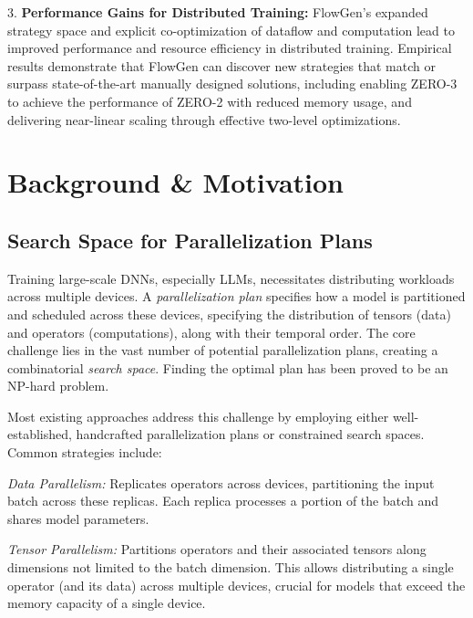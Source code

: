3. \textbf{Performance Gains for Distributed Training:} FlowGen's expanded strategy space and explicit co-optimization of dataflow and computation lead to improved performance and resource efficiency in distributed training. Empirical results demonstrate that FlowGen can discover new strategies that match or surpass state-of-the-art manually designed solutions, including enabling ZERO-3 to achieve the performance of ZERO-2 with reduced memory usage, and delivering near-linear scaling through effective two-level optimizations.

\section{Background \& Motivation}

\subsection{Search Space for Parallelization Plans}



Training large-scale DNNs, especially LLMs, necessitates distributing workloads across multiple devices.  A \textit{parallelization plan} specifies how a model is partitioned and scheduled across these devices, specifying the distribution of tensors (data) and operators (computations), along with their temporal order. The core challenge lies in the vast number of potential parallelization plans, creating a combinatorial \textit{search space}. Finding the optimal plan has been proved to be an NP-hard problem.

Most existing approaches address this challenge by employing either well-established, handcrafted parallelization plans or constrained search spaces. Common strategies include:

\textit{Data Parallelism:} Replicates operators across devices, partitioning the input batch across these replicas. Each replica processes a portion of the batch and shares model parameters.

\textit{Tensor Parallelism:} Partitions operators and their associated tensors along dimensions not limited to the batch dimension. This allows distributing a single operator (and its data) across multiple devices, crucial for models that exceed the memory capacity of a single device.

